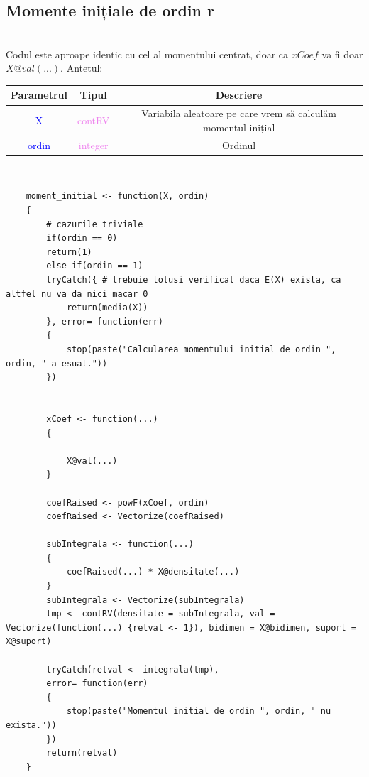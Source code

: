 \documentclass[12pt]{article}
\begin{document}
\subsection{Momente inițiale de ordin r}\hfill \\
\indent Codul este aproape identic cu cel al momentului centrat, doar ca $xCoef$ va fi doar $X@val(...)$. Antetul: 
\begin{center}
	\begin{tabular}{|| c | c | c ||}
		\hline
		Parametrul & Tipul & Descriere \\
		\hline
		\textcolor{blue}{X} & \textcolor{violet}{contRV} & Variabila aleatoare pe care vrem să calculăm momentul inițial\\
		\hline
		\textcolor{blue}{ordin} & \textcolor{violet}{integer} & Ordinul\\
		\hline
	\end{tabular}
\end{center}\hfill \\
\begin{lstlisting}
	moment_initial <- function(X, ordin)
	{
		# cazurile triviale
		if(ordin == 0)
		return(1)
		else if(ordin == 1)
		tryCatch({ # trebuie totusi verificat daca E(X) exista, ca altfel nu va da nici macar 0
			return(media(X))
		}, error= function(err)
		{
			stop(paste("Calcularea momentului initial de ordin ", ordin, " a esuat."))
		})
		
		
		xCoef <- function(...)
		{
			
			X@val(...)
		}
		
		coefRaised <- powF(xCoef, ordin)
		coefRaised <- Vectorize(coefRaised)
		
		subIntegrala <- function(...)
		{
			coefRaised(...) * X@densitate(...)
		}
		subIntegrala <- Vectorize(subIntegrala)
		tmp <- contRV(densitate = subIntegrala, val = Vectorize(function(...) {retval <- 1}), bidimen = X@bidimen, suport = X@suport)
		
		tryCatch(retval <- integrala(tmp),
		error= function(err)
		{
			stop(paste("Momentul initial de ordin ", ordin, " nu exista."))
		})
		return(retval)
	}
\end{lstlisting}
\end{document}

